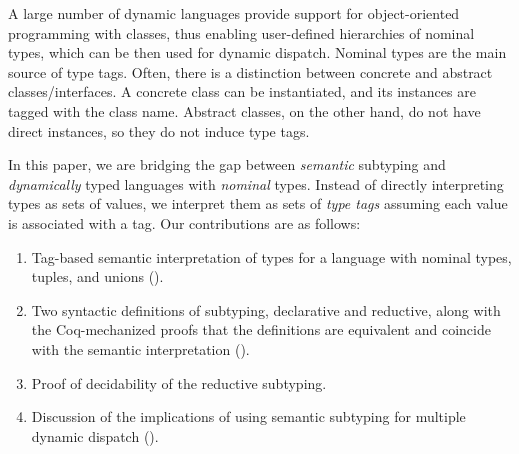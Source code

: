 A large number of dynamic languages provide support 
for object-oriented programming with classes, 
thus enabling user-defined hierarchies of nominal types,
which can be then used for dynamic dispatch.
Nominal types are the main source of type tags.
Often, there is a distinction between concrete 
and abstract classes/interfaces.
A concrete class can be instantiated, 
and its instances are tagged with the class name.
Abstract classes, on the other hand, do not have direct instances,
so they do not induce type tags.

In this paper, we are bridging the gap between \emph{semantic} subtyping 
and \emph{dynamically} typed languages with \emph{nominal} types.
Instead of directly interpreting types as sets of values,
we interpret them as sets of \emph{type tags} assuming 
each value is associated with a tag.
Our contributions are as follows:
\begin{enumerate}
  \item Tag-based semantic interpretation of types for a language
    with nominal types, tuples, and unions ().
  \item Two syntactic definitions of subtyping, declarative and reductive,
    along with the Coq-mechanized proofs that the definitions are equivalent
    and coincide with the semantic interpretation (). 	
  \item Proof of decidability of the reductive subtyping.
  \item Discussion of the implications of using semantic subtyping
    for multiple dynamic dispatch ().
\end{enumerate}






